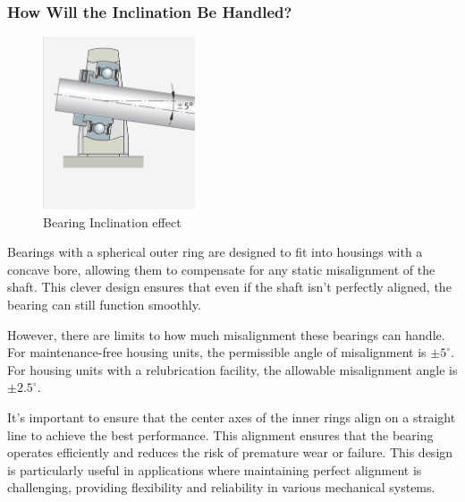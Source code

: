 \documentclass[../../main]{subfiles}
\begin{document}
\subsubsection{How Will the Inclination Be Handled?}
\begin{figure}[h!]
  \centering
  \includegraphics[width=0.4\textwidth]{img/Picture4.png}
  \caption{Bearing Inclination effect}
  \end{figure}

  Bearings with a spherical outer ring are designed to fit into housings with a concave bore, allowing them to compensate for any static misalignment of the shaft. This clever design ensures that even if the shaft isn't perfectly aligned, the bearing can still function smoothly.

However, there are limits to how much misalignment these bearings can handle. For maintenance-free housing units, the permissible angle of misalignment is $\pm 5^\circ$. For housing units with a relubrication facility, the allowable misalignment angle is $\pm 2.5^\circ$.

It's important to ensure that the center axes of the inner rings align on a straight line to achieve the best performance. This alignment ensures that the bearing operates efficiently and reduces the risk of premature wear or failure. This design is particularly useful in applications where maintaining perfect alignment is challenging, providing flexibility and reliability in various mechanical systems.
\end{document}
